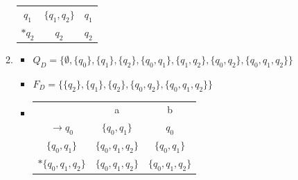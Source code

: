 \documentclass[12pt, a4paper]{report}
\begin{document}
\begin{exercise}
\begin{enumerate}
\begin{enumerate}
\begin{tabular}{|c | c | c |}
                        $q_1$ & $\{q_1,q_2\}$ & $q_1$ \\
                        $*q_2$ & $q_2$ & $q_2$ \\
                        \hline
                    \end{tabular}
                    \item \begin{itemize}
                        \item $Q_D=\{\emptyset, \{q_0\},\{q_1\},\{q_2\},\{q_0,q_1\},\{q_1,q_2\},\{q_0,q_2\},\{q_0,q_1,q_2\}\}$
                        \item $F_D=\{\{q_2\},\{q_1\},\{q_2\},\{q_0,q_2\},\{q_0,q_1,q_2\}\}$
                        \item \begin{tabular}{| c | c | c |}
                            \hline
                            & a & b \\
                            $\to q_0$ & $\{q_0,q_1\}$ & $q_0$\\
                            $\{q_0,q_1\}$ & $\{q_0,q_1,q_2\}$ & $\{q_0,q_1\}$\\
                            $*\{q_0,q_1,q_2\}$ & $\{q_0,q_1,q_2\}$ & $\{q_0,q_1,q_2\}$\\
                            \hline
                        \end{tabular}
                    \end{itemize}
                \end{enumerate}
            \end{enumerate}
        \end{exercise}
\end{document}
